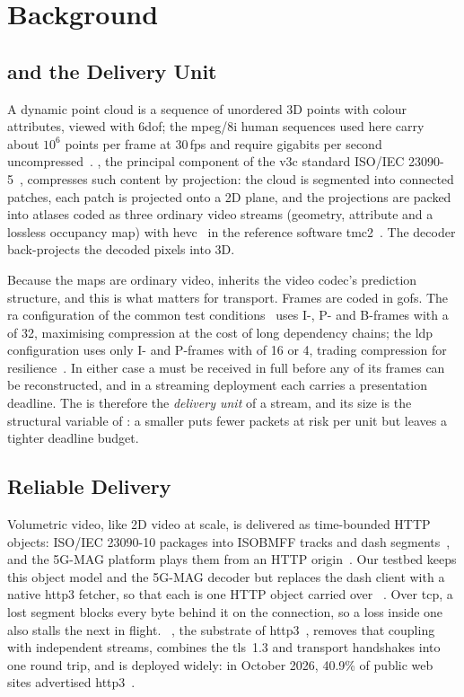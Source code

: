 \section{Background}
\label{sec:background}

\subsection{\vpcc and the Delivery Unit}
\label{sec:bg-codecs}

A dynamic point cloud is a sequence of unordered 3D points with colour
attributes, viewed with \gls{6dof}; the \gls{mpeg}/8i human sequences
used here carry about $10^6$ points per frame at 30\,fps and require
gigabits per second uncompressed~\cite{8i,pcstreaming21}. \vpcc, the
principal component of the \gls{v3c} standard ISO/IEC
23090-5~\cite{v3c,vpccgraziosi}, compresses such content by projection:
the cloud is segmented into connected patches, each patch is projected
onto a 2D plane, and the projections are packed into atlases coded as
three ordinary video streams (geometry, attribute and a lossless
occupancy map) with \gls{hevc}~\cite{hevc} in the reference software
\gls{tmc2}~\cite{tmc2}. The decoder back-projects the decoded pixels
into 3D.

Because the maps are ordinary video, \vpcc inherits the video codec's
prediction structure, and this is what matters for transport. Frames
are coded in \glspl{gof}. The \gls{ra} configuration of the \vpcc common
test conditions~\cite{vpccctc} uses I-, P- and B-frames with a \gof of
32, maximising compression at the cost of long dependency chains; the
\gls{ldp} configuration uses only I- and P-frames with \gofs of 16 or 4,
trading compression for resilience~\cite{hmctc}. In either case a \gof
must be received in full before any of its frames can be reconstructed,
and in a streaming deployment each \gof carries a presentation
deadline. The \gof is therefore the \emph{delivery unit} of a \vpcc
stream, and its size is the structural variable of \crystal: a smaller
\gof puts fewer packets at risk per unit but leaves a tighter deadline
budget.

\subsection{Reliable \quic Delivery}
\label{sec:bg-quic}

Volumetric video, like 2D video at scale, is delivered as time-bounded
HTTP objects: ISO/IEC 23090-10 packages \vpcc into ISOBMFF tracks and
\gls{dash} segments~\cite{v3ccarriage}, and the 5G-MAG platform plays
them from an HTTP origin~\cite{fivegmag}. Our testbed keeps this object
model and the 5G-MAG decoder but replaces the \gls{dash} client with a
native \gls{http3} fetcher, so that each \gof is one HTTP object carried
over \quic~\cite{mosaic2026}. Over \gls{tcp}, a lost segment blocks every
byte behind it on the connection, so a loss inside one \gof also stalls
the next \gof in flight. \quic~\cite{rfc9000}, the substrate of
\gls{http3}~\cite{rfc9114}, removes that coupling with independent
streams, combines the \gls{tls}~1.3 and transport handshakes into one
round trip, and is deployed widely: in October 2026, 40.9\% of public
web sites advertised \gls{http3}~\cite{w3techs2026}.

